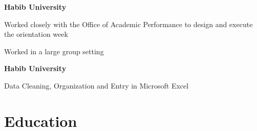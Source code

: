 \documentclass[]{resume}
\begin{document}
\begin{minipage}[t]{0.59\textwidth}

\thinspace \textbf{Habib University}

\begin{tightemize}
\sectionsep
\item Worked closely with the Office of Academic Performance to design and execute the orientation week
\item Worked in a large group setting
\end{tightemize}


\thinspace \textbf{Habib University}

\begin{tightemize}
\sectionsep
\item Data Cleaning, Organization and Entry in Microsoft Excel
\end{tightemize}


\section{Education} 
 
    

\end{minipage}
\end{document}
